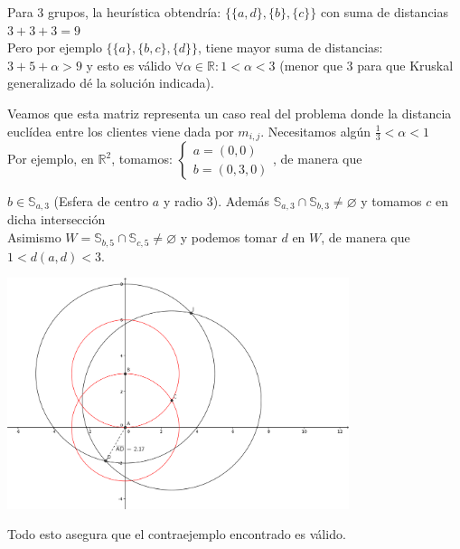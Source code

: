 \documentclass[a4paper, 11pt]{article} %
\let\emptyset\varnothing
\begin{document}
    Para 3 grupos, la heurística obtendría: $\{\{a,d\},\{b\},\{c\}\}$ con suma de distancias $3+3+3=9$\\
    
    Pero por ejemplo $\{\{a\},\{b,c\},\{d\}\}$, tiene mayor suma de distancias:\\
    $3+5+\alpha>9 $ y esto es válido $\forall \alpha\in \mathbb{R}:  1<\alpha<3 $ (menor que 3 para que Kruskal generalizado dé
    la solución indicada).
    
    Veamos que esta matriz representa un caso real del problema donde la distancia euclídea entre los clientes
    viene dada por $m_{i,j}$. Necesitamos algún $\frac{1}{3}<\alpha<1$\\
    
    Por ejemplo, en $\mathbb{R}^2$, tomamos: $\left\{\begin{array}{l}
                                               a=(0,0) \\
                                               b=(0,3,0)
                                              \end{array}\right.$, de manera que
                                              
    $b\in \mathbb{S}_{a,3}$ (Esfera de centro $a$ y radio $3$).
    Además $\mathbb{S}_{a,3}\cap \mathbb{S}_{b,3}\neq \emptyset$
    y tomamos $c$ en dicha intersección\\
    
    Asimismo $W=\mathbb{S}_{b,5}\cap \mathbb{S}_{c,5}\neq \emptyset$
    y podemos tomar $d$ en $W$, de manera que $1<d(a,d)<3$.

     \begin{center}
	\includegraphics[width=10cm]{ej3.png}
     \end{center}  
     
    Todo esto asegura que el contraejemplo encontrado es válido.
    
\end{document}
